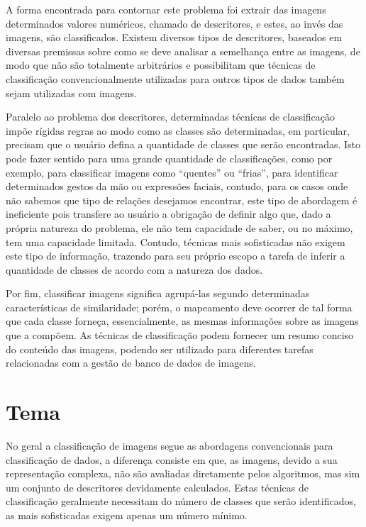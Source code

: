 A forma encontrada para contornar este problema foi extrair das imagens
determinados valores numéricos, chamado de descritores, e estes, ao invés das
imagens, são classificados. Existem diversos tipos de descritores, baseados em
diversas premissas sobre como se deve analisar a semelhança entre as imagens,
de modo que não são totalmente arbitrários e possibilitam que técnicas de
classificação convencionalmente utilizadas para outros tipos de dados também
sejam utilizadas com imagens.

Paralelo ao problema dos descritores, determinadas técnicas de classificação
impõe rígidas regras ao modo como as classes são determinadas, em particular,
precisam que o usuário defina a quantidade de classes que serão encontradas.
Isto pode fazer sentido para uma grande quantidade de classificações, como por
exemplo, para classificar imagens como “quentes” ou “frias”, para identificar
determinados gestos da mão ou expressões faciais, contudo, para os casos onde
não sabemos que tipo de relações desejamos encontrar, este tipo de abordagem é
ineficiente pois transfere ao usuário a obrigação de definir algo que, dado a
própria natureza do problema, ele não tem capacidade de saber, ou no máximo,
tem uma capacidade limitada. Contudo, técnicas mais sofisticadas não exigem este
tipo de informação, trazendo para seu próprio escopo a tarefa de inferir a
quantidade de classes de acordo com a natureza dos dados.

Por fim, classificar imagens significa agrupá-las segundo determinadas
características de similaridade; porém, o mapeamento deve ocorrer de tal forma
que cada classe forneça, essencialmente, as mesmas informações sobre as imagens
que a compõem. As técnicas de classificação podem fornecer um resumo conciso do
conteúdo das imagens, podendo ser utilizado para diferentes tarefas relacionadas
com a gestão de banco de dados de imagens.

\section{Tema}

No geral a classificação de imagens segue as abordagens convencionais para
classificação de dados,  a diferença consiste em que, as imagens, devido a sua
representação complexa, não são avaliadas diretamente pelos algoritmos, mas sim
um conjunto de descritores devidamente calculados. Estas técnicas de
classificação geralmente necessitam do número de classes que serão
identificados, as mais sofisticadas exigem apenas um número mínimo.

